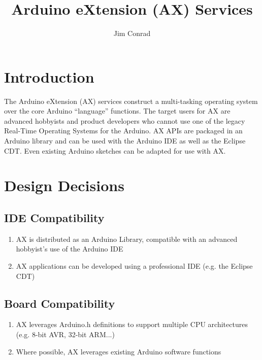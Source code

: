 \documentclass[a4paper,11pt,twoside]{scrartcl}
\title{Arduino eXtension (AX) Services}
\author{Jim Conrad}
\begin{document}
\maketitle
\section{Introduction}
The Arduino eXtension (AX) services construct a multi-tasking operating system over the core Arduino ``language'' functions.
The target users for AX are advanced hobbyists and product developers who cannot use one of the legacy Real-Time Operating Systems for the Arduino.
AX APIs are packaged in an Arduino library and can be used with the Arduino IDE as well as the Eclipse CDT.
Even existing Arduino sketches can be adapted for use with AX.
\section{Design Decisions}
\subsection{IDE Compatibility}
\begin{enumerate}
\item AX is distributed as an Arduino Library, compatible with an advanced hobbyist's use of the Arduino IDE
\item AX applications can be developed using a professional IDE (e.g. the Eclipse CDT)
\end{enumerate}
\subsection{Board Compatibility}
\begin{enumerate}
\item AX leverages Arduino.h definitions to support multiple CPU architectures (e.g. 8-bit AVR, 32-bit ARM...)
\item Where possible, AX leverages existing Arduino software functions
\end{enumerate}
\end{document}

